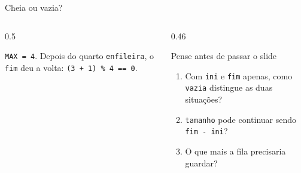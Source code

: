 \documentclass[aspectratio=169]{beamer}
\newcommand{\fila}[3]{%
  \foreach \e [count=\k from 0] in {#3} {
    \node[cel] at (#1+0.55*\k, #2) {\e};
  }
}
\begin{document}
\begin{frame}{Cheia ou vazia?}
  \begin{columns}[c]
    \begin{column}{0.5\textwidth}
      \begin{center}
      \end{center}
      \small \texttt{MAX = 4}. Depois do quarto \texttt{enfileira}, o
      \texttt{fim} deu a volta: \texttt{(3 + 1) \% 4 == 0}.
    \end{column}
    \begin{column}{0.46\textwidth}
      \begin{block}{Pense antes de passar o slide}
        \small
        \begin{enumerate}
          \item Com \texttt{ini} e \texttt{fim} apenas, como \texttt{vazia}
            distingue as duas situações?
          \item \texttt{tamanho} pode continuar sendo \texttt{fim - ini}?
          \item O que mais a fila precisaria guardar?
        \end{enumerate}
      \end{block}
    \end{column}
  \end{columns}
\end{frame}
\end{document}
